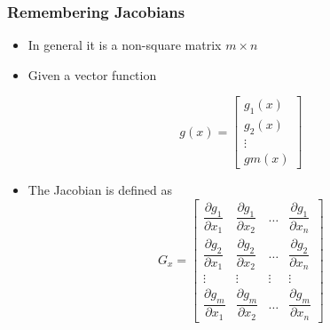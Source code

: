     \begin{frame}
     \frametitle{Remembering Jacobians}
    
     \begin{itemize}
     \item In general it is a non-square matrix $m \times n$
     \item Given a vector function
    
     \begin{equation*}
     g(x) =
     \begin{bmatrix}
     g_{1}(x) \\
     g_{2}(x) \\
     \vdots \\
     gm(x)
     \end{bmatrix}
     \end{equation*}
    
     \item The Jacobian is defined as
     \begin{equation*}
     G_x =
     \begin{bmatrix}
     \dfrac{\partial g_{1}}{\partial x_{1}} & \dfrac{\partial g_{1}}{\partial x_{2}}& \dots & \dfrac{\partial g_{1}}{\partial x_{n}}\\
     \dfrac{\partial g_{2}}{\partial x_{1}} & \dfrac{\partial g_{2}}{\partial x_{2}}& \dots & \dfrac{\partial g_{2}}{\partial x_{n}}\\
     \vdots & \vdots& \vdots & \vdots\\
     \dfrac{\partial g_{m}}{\partial x_{1}} & \dfrac{\partial g_{m}}{\partial x_{2}}& \dots & \dfrac{\partial g_{m}}{\partial x_{n}}
     \end{bmatrix}
     \end{equation*}
     \end{itemize}
\end{frame}


